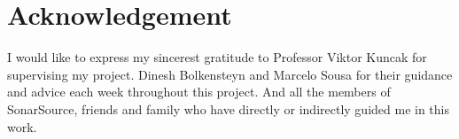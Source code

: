 \section*{Acknowledgement}
\label{sec:acknowledgements}

I would like to express my sincerest gratitude to Professor Viktor Kuncak for supervising my project.
\newline
\newline
Dinesh Bolkensteyn and Marcelo Sousa for their guidance and advice each week throughout this project.
\newline
\newline
And all the members of SonarSource, friends and family who have directly or indirectly guided me in this work.